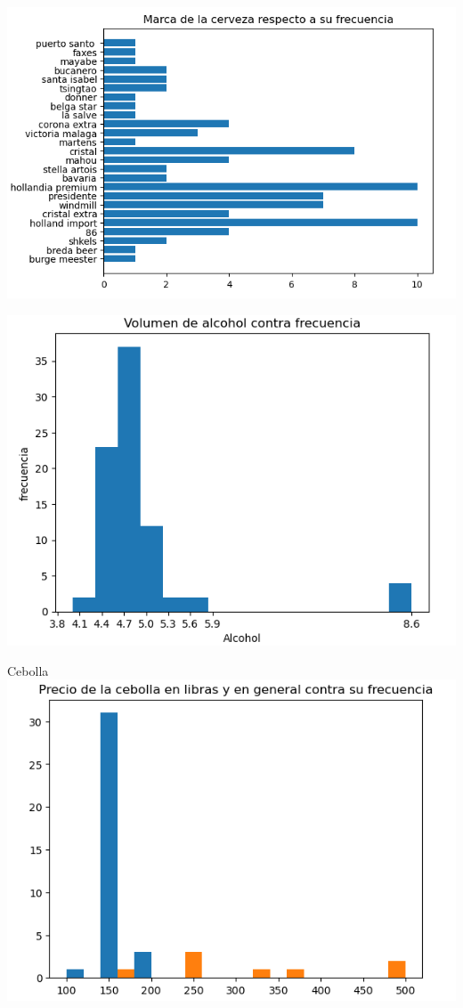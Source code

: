 \documentclass{beamer}
\begin{document}
\begin{frame}
    \includegraphics[scale=0.5]{marca de cerve.png}
    \end{frame}

\begin{frame}
    \includegraphics[scale=0.5]{volume cerveza.png}
    \end{frame}

\begin{frame}{Cebolla}
    \includegraphics[scale=0.5]{precio de cebolla.png}
    \end{frame}
\end{document}
